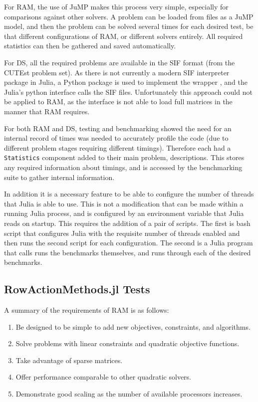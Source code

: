 For RAM, the use of JuMP makes this process very simple, especially for comparisons against other solvers. A problem can be loaded from files as a JuMP model, and then the problem can be solved several times for each desired test, be that different configurations of RAM, or different solvers entirely. All required statistics can then be gathered and saved automatically. 

For DS, all the required problems are available in the SIF format (from the CUTEst problem set). As there is not currently a modern SIF interpreter package in Julia, a Python package is used to implement the wrapper \cite{PyCUTEst}, and the Julia's python interface \cite{JuliaPyCall} calls the SIF files. Unfortunately this approach could not be applied to RAM, as the interface is not able to load full matrices in the manner that RAM requires.  

For both RAM and DS, testing and benchmarking showed the need for an internal record of times was needed to accurately profile the code (due to different problem stages requiring different timings). Therefore each had a \texttt{Statistics} component added to their main problem, descriptions. This stores any required information about timings, and is accessed by the benchmarking suite to gather internal information.

In addition it is a necessary feature to be able to configure the number of threads that Julia is able to use. This is not a modification that can be made within a running Julia process, and is configured by an environment variable that Julia reads on startup. This requires the addition of a pair of scripts. The first is bash script that configures Julia with the requisite number of threads enabled and then runs the second script for each configuration. The second is a Julia program that calls runs the benchmarks themselves, and runs through each of the desired benchmarks.

\subsection{RowActionMethods.jl Tests}

A summary of the requirements of RAM is as follows:

\begin{enumerate}
    \item Be designed to be simple to add new objectives, constraints, and algorithms. 
    \item Solve problems with linear constraints and quadratic objective functions.
    \item Take advantage of sparse matrices.
    \item Offer performance comparable to other quadratic solvers.
    \item Demonstrate good scaling as the number of available processors increases. 
\end{enumerate}

